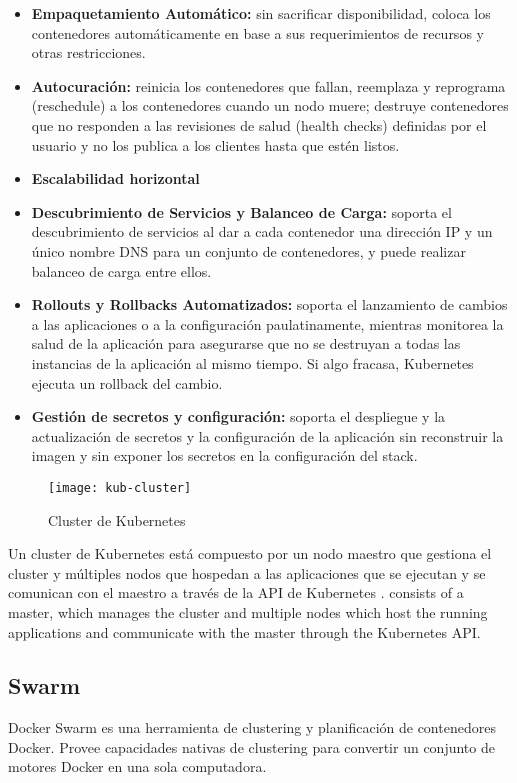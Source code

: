 \begin{itemize}

\item \textbf{Empaquetamiento Automático: }sin sacrificar disponibilidad, coloca los contenedores automáticamente en base a sus requerimientos de recursos y otras restricciones.
\item \textbf{Autocuración: }reinicia los contenedores que fallan, reemplaza y reprograma (reschedule) a los contenedores cuando un nodo muere; destruye contenedores que no responden a las revisiones de salud (health checks) definidas por el usuario y no los publica a los clientes hasta que estén listos.
\item \textbf{Escalabilidad horizontal}
\item \textbf{Descubrimiento de Servicios y Balanceo de Carga: }soporta el descubrimiento de servicios al dar a cada contenedor una dirección IP y un único nombre DNS para un conjunto de contenedores, y puede realizar balanceo de carga entre ellos.
\item \textbf{Rollouts y Rollbacks Automatizados: }soporta el lanzamiento de cambios a las aplicaciones o a la configuración paulatinamente, mientras monitorea la salud de la aplicación para asegurarse que no se destruyan a todas las instancias de la aplicación al mismo tiempo. Si algo fracasa, Kubernetes ejecuta un rollback del cambio.
\item \textbf{Gestión de secretos y configuración: }soporta el despliegue y la actualización de secretos y la configuración de la aplicación sin reconstruir la imagen y sin exponer los secretos en la configuración del stack.

\end{itemize}

\begin{figure}[H]
    \centering
    \texttt{[image: kub-cluster]}
    \caption{ Cluster de Kubernetes \protect\cite{Kubernetes2016-jo}}
    \label{fig:kub-cluster}
\end{figure}

Un cluster de Kubernetes está compuesto por un nodo maestro que gestiona el cluster y múltiples nodos que hospedan a las aplicaciones que se ejecutan y se comunican con el maestro a través de la API de Kubernetes \cite{Kubernetes2016-jo}.
consists of a master, which manages the cluster and multiple nodes which host the running applications and communicate with the master through the Kubernetes API.


\subsection{Swarm}
Docker Swarm \cite{Docker2016-yo} es una herramienta de clustering y planificación de contenedores Docker. Provee capacidades nativas de clustering para convertir un conjunto de motores Docker en una sola computadora.

